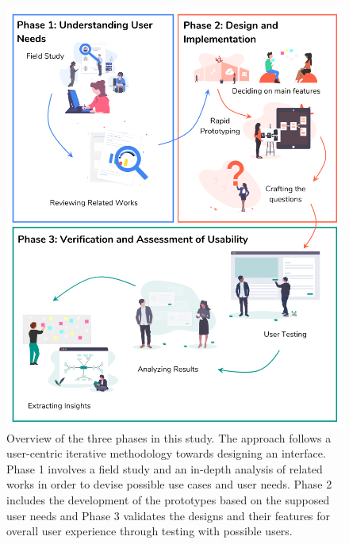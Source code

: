 \documentclass{sigchi}
\begin{document}
\begin{figure}[t]
\centering
\includegraphics[width = 0.85 \linewidth]{figures/method.png}
\caption{Overview of the three phases in this study. The approach follows a user-centric iterative methodology towards designing an interface. Phase 1 involves a field study and an in-depth analysis of related works in order to devise possible use cases and user needs. Phase 2 includes the development of the prototypes based on the supposed user needs and Phase 3 validates the designs and their features for overall user experience through testing with possible users. }\label{fig:method}
\end{figure}
\end{document}
